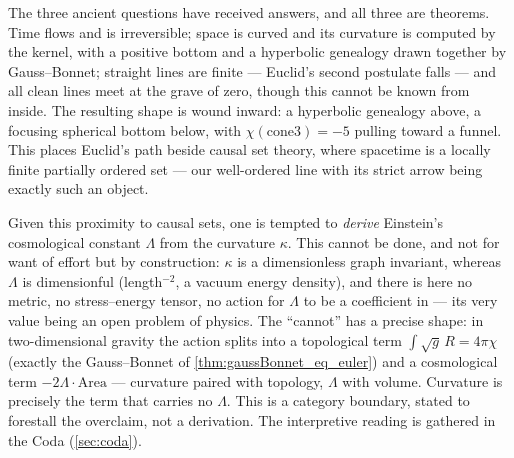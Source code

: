 The three ancient questions have received answers, and all three are theorems. Time flows and is
irreversible; space is curved and its curvature is computed by the kernel, with a positive bottom and
a hyperbolic genealogy drawn together by Gauss--Bonnet; straight lines are finite --- Euclid's second
postulate falls --- and all clean lines meet at the grave of zero, though this cannot be known from
inside. The resulting shape is wound inward: a hyperbolic genealogy above, a focusing spherical bottom
below, with $\chi(\mathrm{cone3}) = -5$ pulling toward a funnel. This places Euclid's path beside
causal set theory, where spacetime is a locally finite partially ordered set --- our well-ordered line
with its strict arrow being exactly such an object.

\begin{remark}
Given this proximity to causal sets, one is tempted to \emph{derive} Einstein's cosmological constant
$\Lambda$ from the curvature $\kappa$. This cannot be done, and not for want of effort but by
construction: $\kappa$ is a dimensionless graph invariant, whereas $\Lambda$ is dimensionful
(length$^{-2}$, a vacuum energy density), and there is here no metric, no stress--energy tensor, no
action for $\Lambda$ to be a coefficient in --- its very value being an open problem of physics. The
``cannot'' has a precise shape: in two-dimensional gravity the action splits into a topological term
$\int\!\sqrt{g}\,R = 4\pi\chi$ (exactly the Gauss--Bonnet of \cref{thm:gaussBonnet_eq_euler}) and a
cosmological term $-2\Lambda\cdot\mathrm{Area}$ --- curvature paired with topology, $\Lambda$ with
volume. Curvature is precisely the term that carries no $\Lambda$. This is a category boundary, stated
to forestall the overclaim, not a derivation. The interpretive reading is gathered in the Coda
(\cref{sec:coda}).
\end{remark}
